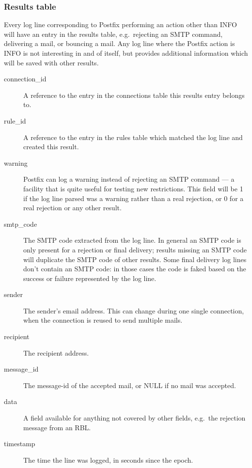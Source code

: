 \documentclass[a4paper,12pt,draft]{article}
\begin{document}
\subsubsection{Results table}

Every log line corresponding to Postfix performing an action other than
INFO will have an entry in the results table, e.g.\ rejecting an SMTP
command, delivering a mail, or bouncing a mail.  Any log line where the
Postfix action is INFO is not interesting in and of itself, but provides
additional information which will be saved with other results.

\begin{description}

    \item [connection\_id] A reference to the entry in the connections
        table this results entry belongs to.

    \item [rule\_id] A reference to the entry in the rules table which
        matched the log line and created this result.

    \item [warning] Postfix can log a warning instead of rejecting an SMTP
        command --- a facility that is quite useful for testing new
        restrictions.  This field will be 1 if the log line parsed was a
        warning rather than a real rejection, or 0 for a real rejection or
        any other result.

    \item [smtp\_code] The SMTP code extracted from the log line.  In
        general an SMTP code is only present for a rejection or final
        delivery; results missing an SMTP code will duplicate the SMTP code
        of other results.  Some final delivery log lines don't contain an
        SMTP code: in those cases the code is faked based on the success or
        failure represented by the log line.

    \item [sender] The sender's email address.  This can change during one
        single connection, when the connection is reused to send multiple
        mails.

    \item [recipient] The recipient address.

    \item [message\_id] The message-id of the accepted mail, or NULL if no
        mail was accepted.

    \item [data] A field available for anything not covered by other
        fields, e.g.\ the rejection message from an RBL\@.

    \item [timestamp] The time the line was logged, in seconds since the
        epoch.

\end{description}
\end{document}
